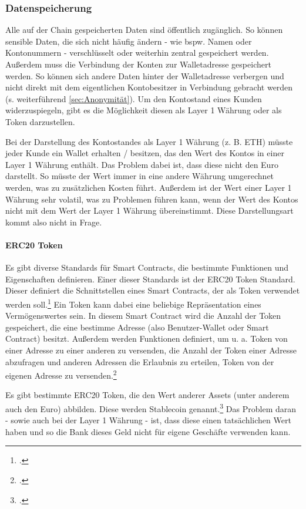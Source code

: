 \subsubsection{Datenspeicherung}
Alle auf der Chain gespeicherten Daten sind öffentlich zugänglich.
So können sensible Daten, die sich nicht häufig ändern - wie bspw. Namen oder Kontonummern - verschlüsselt oder weiterhin zentral gespeichert werden.
Außerdem muss die Verbindung der Konten zur Walletadresse gespeichert werden. 
So können sich andere Daten hinter der Walletadresse verbergen und nicht direkt mit dem eigentlichen Kontobesitzer in Verbindung gebracht werden (s. weiterführend \ref{sec:Anonymität}).
Um den Kontostand eines Kunden widerzuspiegeln, gibt es die Möglichkeit diesen als Layer 1 Währung oder als Token darzustellen.

\noindent
Bei der Darstellung des Kontostandes als Layer 1 Währung (z. B. ETH) müsste jeder Kunde ein Wallet erhalten / besitzen, das den Wert des Kontos in einer Layer 1 Währung enthält.
Das Problem dabei ist, dass diese nicht den Euro darstellt. 
So müsste der Wert immer in eine andere Währung umgerechnet werden, was zu zusätzlichen Kosten führt. Außerdem ist der Wert einer Layer 1 Währung sehr volatil, was zu Problemen führen kann, wenn der Wert des Kontos nicht mit dem Wert der Layer 1 Währung übereinstimmt.
Diese Darstellungsart kommt also nicht in Frage.

\paragraph{ERC20 Token}
Es gibt diverse Standards für Smart Contracts, die bestimmte Funktionen und Eigenschaften definieren.
Einer dieser Standards ist der ERC20 Token Standard.
Dieser definiert die Schnittstellen eines Smart Contracts, der als Token verwendet werden soll.\footcite[Vgl. hierzu und zum Folgenden][]{w7}
Ein Token kann dabei eine beliebige Repräsentation eines Vermögenswertes sein.
In diesem Smart Contract wird die Anzahl der Token gespeichert, die eine bestimme Adresse (also Benutzer-Wallet oder Smart Contract) besitzt.
Außerdem werden Funktionen definiert, um u. a. Token von einer Adresse zu einer anderen zu versenden, die Anzahl der Token einer Adresse abzufragen und anderen Adressen die Erlaubnis zu erteilen, Token von der eigenen Adresse zu versenden.\footcites[Vgl.][]{w8}[]{w7}

\bigbreak
\noindent
Es gibt bestimmte ERC20 Token, die den Wert anderer Assets (unter anderem auch den Euro) abbilden. Diese werden Stablecoin genannt.\footcite[Vgl. hierzu und weiterführend][4]{q8}
Das Problem daran - sowie auch bei der Layer 1 Währung - ist, dass diese einen tatsächlichen Wert haben und so die Bank dieses Geld nicht für eigene Geschäfte verwenden kann.

